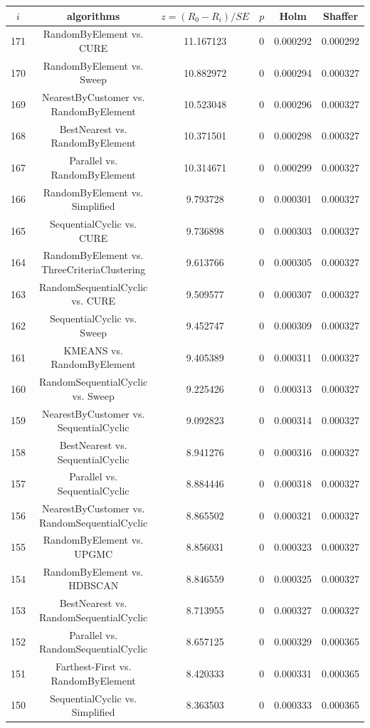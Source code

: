 \documentclass[a4paper,10pt]{article}
\begin{document}
\begin{landscape}
\begin{table}[!htp]
\centering\scriptsize
\begin{tabular}{cccccc}
$i$&algorithms&$z=(R_0 - R_i)/SE$&$p$&Holm&Shaffer\\
\hline171&RandomByElement vs. CURE&11.167123&0&0.000292&0.000292\\
170&RandomByElement vs. Sweep&10.882972&0&0.000294&0.000327\\
169&NearestByCustomer vs. RandomByElement&10.523048&0&0.000296&0.000327\\
168&BestNearest vs. RandomByElement&10.371501&0&0.000298&0.000327\\
167&Parallel vs. RandomByElement&10.314671&0&0.000299&0.000327\\
166&RandomByElement vs. Simplified&9.793728&0&0.000301&0.000327\\
165&SequentialCyclic vs. CURE&9.736898&0&0.000303&0.000327\\
164&RandomByElement vs. ThreeCriteriaClustering&9.613766&0&0.000305&0.000327\\
163&RandomSequentialCyclic vs. CURE&9.509577&0&0.000307&0.000327\\
162&SequentialCyclic vs. Sweep&9.452747&0&0.000309&0.000327\\
161&KMEANS vs. RandomByElement&9.405389&0&0.000311&0.000327\\
160&RandomSequentialCyclic vs. Sweep&9.225426&0&0.000313&0.000327\\
159&NearestByCustomer vs. SequentialCyclic&9.092823&0&0.000314&0.000327\\
158&BestNearest vs. SequentialCyclic&8.941276&0&0.000316&0.000327\\
157&Parallel vs. SequentialCyclic&8.884446&0&0.000318&0.000327\\
156&NearestByCustomer vs. RandomSequentialCyclic&8.865502&0&0.000321&0.000327\\
155&RandomByElement vs. UPGMC&8.856031&0&0.000323&0.000327\\
154&RandomByElement vs. HDBSCAN&8.846559&0&0.000325&0.000327\\
153&BestNearest vs. RandomSequentialCyclic&8.713955&0&0.000327&0.000327\\
152&Parallel vs. RandomSequentialCyclic&8.657125&0&0.000329&0.000365\\
151&Farthest-First vs. RandomByElement&8.420333&0&0.000331&0.000365\\
150&SequentialCyclic vs. Simplified&8.363503&0&0.000333&0.000365\\

\end{tabular}
\end{table}
\end{landscape}
\end{document}
